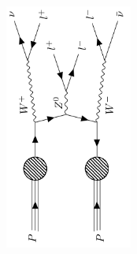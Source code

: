 \begin{figure}
{\begin{subfigure}{.5\textwidth}
            \caption{}
            \label{fig:ww}
        \end{subfigure}
        \hspace{1.5cm}
        \begin{subfigure}{.5\textwidth}
            \includegraphics[width=0.46\textwidth, angle = -90]{Figures/FDiagrams/WZW.png}
            \caption{}
            \label{fig:zzz}
        \end{subfigure}
    }
    \\
    \newline
\end{figure}
